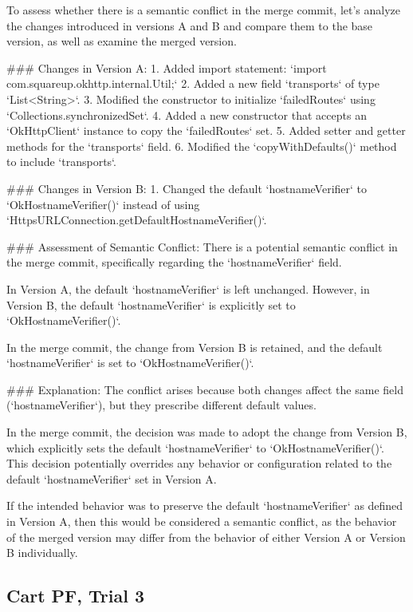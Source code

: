 \begin{answer}
  To assess whether there is a semantic conflict in the merge commit, let's analyze the changes introduced in versions A and B and compare them to the base version, as well as examine the merged version.

  ### Changes in Version A:
  1. Added import statement: `import com.squareup.okhttp.internal.Util;`
  2. Added a new field `transports` of type `List<String>`.
  3. Modified the constructor to initialize `failedRoutes` using `Collections.synchronizedSet`.
  4. Added a new constructor that accepts an `OkHttpClient` instance to copy the `failedRoutes` set.
  5. Added setter and getter methods for the `transports` field.
  6. Modified the `copyWithDefaults()` method to include `transports`.
  
  ### Changes in Version B:
  1. Changed the default `hostnameVerifier` to `OkHostnameVerifier()` instead of using `HttpsURLConnection.getDefaultHostnameVerifier()`.
  
  ### Assessment of Semantic Conflict:
  There is a potential semantic conflict in the merge commit, specifically regarding the `hostnameVerifier` field.
  
  In Version A, the default `hostnameVerifier` is left unchanged. However, in Version B, the default `hostnameVerifier` is explicitly set to `OkHostnameVerifier()`.
  
  In the merge commit, the change from Version B is retained, and the default `hostnameVerifier` is set to `OkHostnameVerifier()`.
  
  ### Explanation:
  The conflict arises because both changes affect the same field (`hostnameVerifier`), but they prescribe different default values.
  
  In the merge commit, the decision was made to adopt the change from Version B, which explicitly sets the default `hostnameVerifier` to `OkHostnameVerifier()`. This decision potentially overrides any behavior or configuration related to the default `hostnameVerifier` set in Version A.
  
  If the intended behavior was to preserve the default `hostnameVerifier` as defined in Version A, then this would be considered a semantic conflict, as the behavior of the merged version may differ from the behavior of either Version A or Version B individually.
\end{answer}

\subsection{Cart PF, Trial 3}


